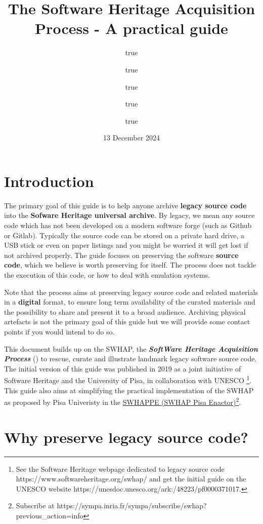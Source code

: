 \documentclass[]{article}
\title{The Software Heritage Acquisition Process - A practical guide}
\author{true \and true \and true \and true \and true}
\date{13 December 2024}
\begin{document}
\maketitle

{
\setcounter{tocdepth}{2}
\tableofcontents
}
\hypertarget{introduction}{%
\section{Introduction}\label{introduction}}

The primary goal of this guide is to help anyone archive \textbf{legacy
source code} into the \textbf{Sofware Heritage universal archive}. By
legacy, we mean any source code which has not been developed on a modern
software forge (such as Github or Gitlab). Typically the source code can
be stored on a private hard drive, a USB stick or even on paper listings
and you might be worried it will get lost if not archived properly. The
guide focuses on preserving the software \textbf{source code}, which we
believe is worth preserving for itself. The process does not tackle the
execution of this code, or how to deal with emulation systems.

Note that the process aims at preserving legacy source code and related
materials in a \textbf{digital} format, to ensure long term availability
of the curated materials and the possibility to share and present it to
a broad audience. Archiving physical artefacts is not the primary goal
of this guide but we will provide some contact points if you would
intend to do so.

This document builds up on the SWHAP, the \textbf{\emph{SoftWare
Heritage Acquisition Process}} (\textcite{swhcacm2018}) to rescue,
curate and illustrate landmark legacy software source code. The initial
version of this guide was published in 2019 as a joint initiative of
Software Heritage and the University of Pisa, in collaboration with
UNESCO \footnote{See the Software Heritage webpage dedicated to legacy
  source code https://www.softwareheritage.org/swhap/ and get the
  initial guide on the UNESCO website
  https://unesdoc.unesco.org/ark:/48223/pf0000371017.}. This guide also
aims at simplifying the practical implementation of the SWHAP as
proposed by Pisa Univeristy in the
\href{https://github.com/SoftwareHeritage/swhapguide/blob/master/SWHAP\%40Pisa.pdf}{SWHAPPE
(SWHAP Pisa Enactor)}\footnote{Subscribe at
  https://sympa.inria.fr/sympa/subscribe/swhap?previous\_action=info}.

\hypertarget{sec:whypreserve}{%
\section{Why preserve legacy source code?}\label{sec:whypreserve}}
\end{document}
